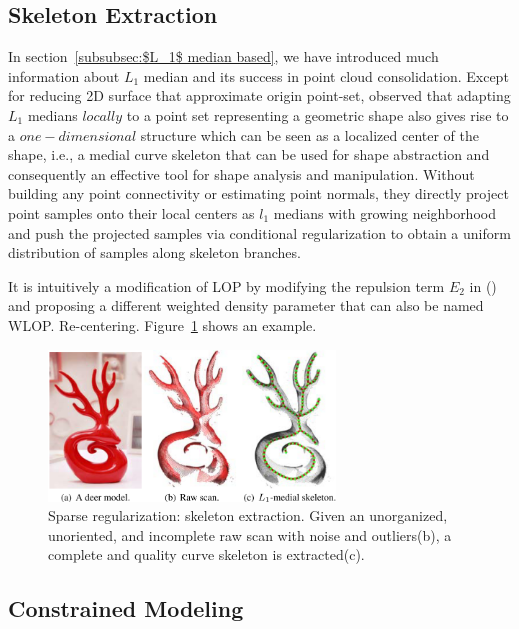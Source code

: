 


\subsection{Skeleton Extraction}
In section~\ref{subsubsec:$L_1$ median based}, we have introduced much information about $L_1$ median and its success in point cloud consolidation.
Except for reducing 2D surface that approximate origin point-set,
\cite{huang2013l1} observed that adapting $L_1$ medians $locally$ to a point set representing a geometric shape also gives rise to a $one-dimensional$ structure which can be seen as a localized center of the shape, i.e., a medial curve skeleton that can be used for shape abstraction and consequently an effective tool for shape analysis and manipulation\cite{cornea2007curve}.
Without building any point connectivity or estimating point normals, they directly project point samples onto their local centers as $l_1$ medians with growing neighborhood and push the projected samples via conditional regularization to obtain a uniform distribution of samples along skeleton branches.

It is intuitively a modification of LOP by modifying the repulsion term $E_2$ in () and proposing a different weighted density parameter that can also be named WLOP\cite{huang2009consolidation}. Re-centering. Figure~\ref{fig:skeleton extraction} shows an example.

\begin{figure}[ht]
  \centering
  \includegraphics[width=3in]{images/skeleton_L1}
  \caption{Sparse regularization: skeleton extraction\cite{huang2013l1}. Given an unorganized, unoriented, and incomplete raw scan with noise and outliers(b), a complete and quality curve skeleton is extracted(c).}
  \label{fig:skeleton extraction}
\end{figure}


\subsection{Constrained Modeling}

